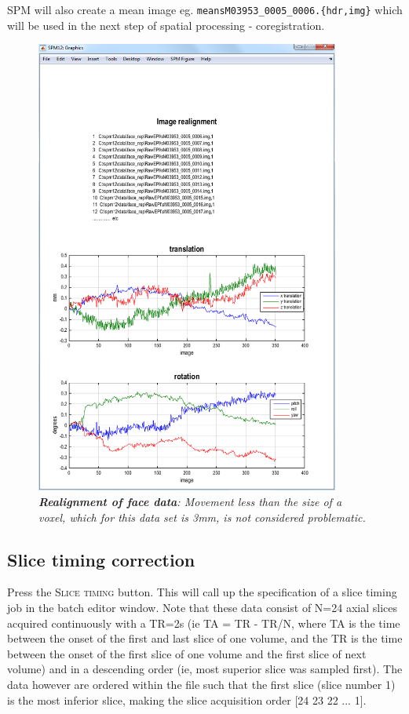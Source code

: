 SPM will also create a mean image eg. \texttt{meansM03953\_0005\_0006.\{hdr,img\}} which will be used in the next step of spatial processing - coregistration.
\begin{figure}
\begin{center}
\includegraphics[width=100mm]{faces/realign}
\caption{\em \textbf{Realignment of face data}: Movement less than the size of a voxel, which for this data set is 3mm, is not considered problematic. \label{face_realign}}
\end{center}
\end{figure}

\subsection{Slice timing correction}

Press the \textsc{Slice timing} button. This will call up the specification of a slice timing job in the batch editor window. Note that these data consist of N=24 axial slices acquired continuously with a TR=2s (ie TA = TR - TR/N, where TA is the time between the onset of the first and last slice of one volume, and the TR is the time between the onset of the first slice of one volume and the first slice of next volume) and in a descending order (ie, most superior slice was sampled first). The data however are ordered within the file such that the first slice (slice number 1) is the most inferior slice, making the slice acquisition order [24 23 22 ... 1].

